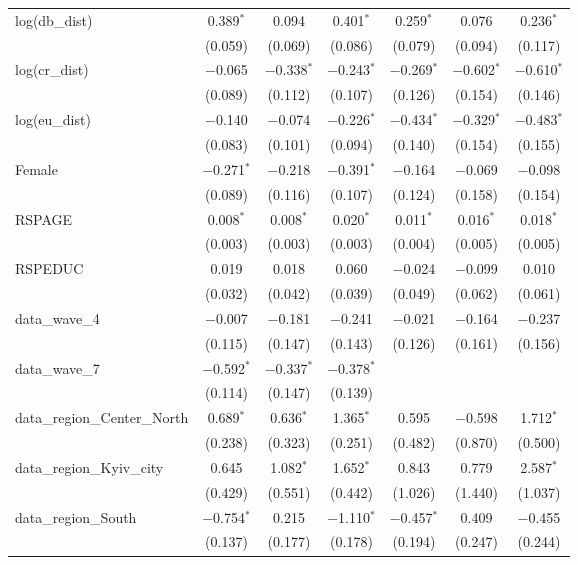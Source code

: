 \begin{table}[!htbp]
\begin{tabular}{@{\extracolsep{1pt}}lcccccc}
  log(db\_dist) & 0.389$^{*}$ & 0.094 & 0.401$^{*}$ & 0.259$^{*}$ & 0.076 & 0.236$^{*}$ \\ 
  & (0.059) & (0.069) & (0.086) & (0.079) & (0.094) & (0.117) \\ 
  log(cr\_dist) & $-$0.065 & $-$0.338$^{*}$ & $-$0.243$^{*}$ & $-$0.269$^{*}$ & $-$0.602$^{*}$ & $-$0.610$^{*}$ \\ 
  & (0.089) & (0.112) & (0.107) & (0.126) & (0.154) & (0.146) \\ 
  log(eu\_dist) & $-$0.140 & $-$0.074 & $-$0.226$^{*}$ & $-$0.434$^{*}$ & $-$0.329$^{*}$ & $-$0.483$^{*}$ \\ 
  & (0.083) & (0.101) & (0.094) & (0.140) & (0.154) & (0.155) \\ 
  Female & $-$0.271$^{*}$ & $-$0.218 & $-$0.391$^{*}$ & $-$0.164 & $-$0.069 & $-$0.098 \\ 
  & (0.089) & (0.116) & (0.107) & (0.124) & (0.158) & (0.154) \\ 
  RSPAGE & 0.008$^{*}$ & 0.008$^{*}$ & 0.020$^{*}$ & 0.011$^{*}$ & 0.016$^{*}$ & 0.018$^{*}$ \\ 
  & (0.003) & (0.003) & (0.003) & (0.004) & (0.005) & (0.005) \\ 
  RSPEDUC & 0.019 & 0.018 & 0.060 & $-$0.024 & $-$0.099 & 0.010 \\ 
  & (0.032) & (0.042) & (0.039) & (0.049) & (0.062) & (0.061) \\ 
  data\_wave\_4 & $-$0.007 & $-$0.181 & $-$0.241 & $-$0.021 & $-$0.164 & $-$0.237 \\ 
  & (0.115) & (0.147) & (0.143) & (0.126) & (0.161) & (0.156) \\ 
  data\_wave\_7 & $-$0.592$^{*}$ & $-$0.337$^{*}$ & $-$0.378$^{*}$ &  &  &  \\ 
  & (0.114) & (0.147) & (0.139) &  &  &  \\ 
  data\_region\_Center\_North & 0.689$^{*}$ & 0.636$^{*}$ & 1.365$^{*}$ & 0.595 & $-$0.598 & 1.712$^{*}$ \\ 
  & (0.238) & (0.323) & (0.251) & (0.482) & (0.870) & (0.500) \\ 
  data\_region\_Kyiv\_city & 0.645 & 1.082$^{*}$ & 1.652$^{*}$ & 0.843 & 0.779 & 2.587$^{*}$ \\ 
  & (0.429) & (0.551) & (0.442) & (1.026) & (1.440) & (1.037) \\ 
  data\_region\_South & $-$0.754$^{*}$ & 0.215 & $-$1.110$^{*}$ & $-$0.457$^{*}$ & 0.409 & $-$0.455 \\ 
  & (0.137) & (0.177) & (0.178) & (0.194) & (0.247) & (0.244) \\ 

\end{tabular}
\end{table}
